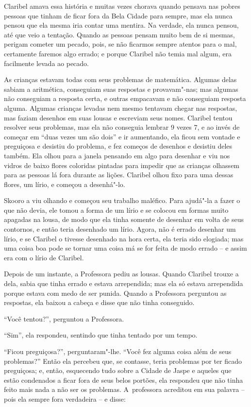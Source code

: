 Claribel amava essa história e muitas vezes chorava quando pensava nas
pobres pessoas que tinham de ficar fora da Bela Cidade para sempre, mas
ela nunca pensou que ela mesma iria contar uma mentira. Na verdade, ela
nunca pensou, até que veio a tentação. Quando as pessoas pensam muito
bem de si mesmas, perigam cometer um pecado, pois, se não ficarmos
sempre atentos para o mal, certamente faremos algo errado; e porque
Claribel não temia mal algum, era facilmente levada ao pecado.

As crianças estavam todas com seus problemas de matemática. Algumas
delas sabiam a aritmética, conseguiam suas respostas e provavam"-nas; mas
algumas não conseguiam a resposta certa, e outras empacavam e não
conseguiam resposta alguma. Algumas crianças levadas nem mesmo tentavam
chegar nas respostas, mas faziam desenhos em suas lousas e escreviam
seus nomes. Claribel tentou resolver seus problemas, mas ela não
conseguia lembrar 9 vezes 7, e ao invés de começar em ``duas vezes um
são dois'' e ir aumentando, ela ficou sem vontade e preguiçosa e
desistiu do problema, e fez começos de desenhos e desistiu deles também.
Ela olhou para a janela pensando em algo para desenhar e viu nos vidros
de baixo flores coloridas pintadas para impedir que as crianças olhassem
para as pessoas lá fora durante as lições. Claribel olhou fixo para uma
dessas flores, um lírio, e começou a desenhá"-lo.



Skooro a viu olhando e começou seu trabalho maléfico. Para ajudá"-la a
fazer o que não devia, ele tomou a forma de um lírio e se colocou em
formas muito apagadas na lousa, de modo que ela tinha somente de desenhar
em volta de seus contornos, e então teria desenhado um lírio. Agora, não
é errado desenhar um lírio, e se Claribel o tivesse desenhado na hora
certa, ela teria sido elogiada; mas uma coisa boa pode se tornar uma
coisa má se for feita de modo errado -- e assim era com o lírio de
Claribel.

Depois de um instante, a Professora pediu as lousas. Quando Claribel
trouxe a dela, sabia que tinha errado e estava arrependida; mas ela só
estava arrependida porque estava com medo de ser punida. Quando a
Professora perguntou as respostas, ela baixou a cabeça e disse que não
tinha conseguido.

``Você tentou?'', perguntou a Professora.

``Sim'', ela respondeu, sentindo que tinha tentado por um tempo.

``Ficou preguiçosa?'', perguntaram"-lhe. ``Você fez alguma coisa além de
seus problemas?'' Então ela percebeu que, se contasse, teria problemas por
ter ficado preguiçosa; e, então, esquecendo tudo sobre a Cidade de Jaspe
e aqueles que estão condenados a ficar fora de seus belos portões, ela
respondeu que não tinha feito mais nada a não ser os problemas. A~professora acreditou em sua palavra -- pois ela sempre fora verdadeira
-- e disse:

